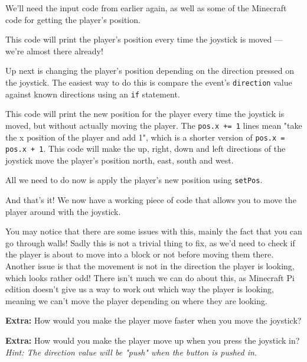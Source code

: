 			We'll need the input code from earlier again, as well as some of the Minecraft code for getting the player's position.

			

			This code will print the player's position every time the joystick is moved --- we're almost there already!

			Up next is changing the player's position depending on the direction pressed on the joystick. The easiest way to do this is compare the event's \texttt{direction} value against known directions using an \texttt{if} statement.

			

			This code will print the new position for the player every time the joystick is moved, but without actually moving the player. The \texttt{pos.x += 1} lines mean "take the x position of the player and add 1", which is a shorter version of \texttt{pos.x = pos.x + 1}. This code will make the up, right, down and left directions of the joystick move the player's position north, east, south and west.

			All we need to do now is apply the player's new position using \texttt{setPos}.

			

			And that's it! We now have a working piece of code that allows you to move the player around with the joystick.

			You may notice that there are some issues with this, mainly the fact that you can go through walls! Sadly this is not a trivial thing to fix, as we'd need to check if the player is about to move into a block or not before moving them there. Another issue is that the movement is not in the direction the player is looking, which looks rather odd! There isn't much we can do about this, as Minecraft Pi edition doesn't give us a way to work out which way the player is looking, meaning we can't move the player depending on where they are looking.

			\textbf{Extra:} How would you make the player move faster when you move the joystick?

			\textbf{Extra:} How would you make the player move up when you press the joystick in? \textit{Hint: The direction value will be "push" when the button is pushed in.}

